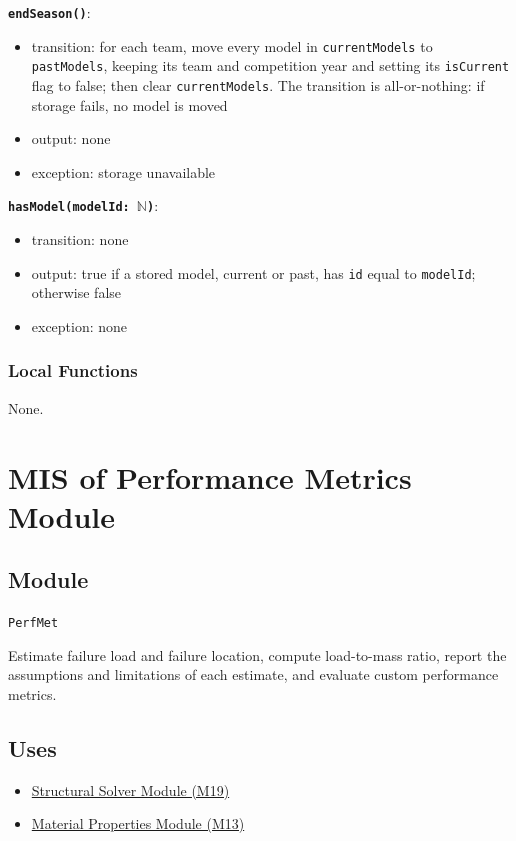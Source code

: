 \documentclass[12pt, titlepage]{article}
\begin{document}
\textbf{\texttt{endSeason()}}:
\begin{itemize}
  \item transition: for each team, move every model in \texttt{currentModels} to \texttt{pastModels}, keeping its team and competition year and setting its \texttt{isCurrent} flag to false; then clear \texttt{currentModels}. The transition is all-or-nothing: if storage fails, no model is moved
  \item output: none
  \item exception: storage unavailable
\end{itemize}

\textbf{\texttt{hasModel(modelId: $\mathbb{N}$)}}:
\begin{itemize}
  \item transition: none
  \item output: true if a stored model, current or past, has \texttt{id} equal to \texttt{modelId}; otherwise false
  \item exception: none
\end{itemize}

\subsubsection{Local Functions}
None.

\newpage

\section{MIS of Performance Metrics Module} \label{mMetrics}

\subsection{Module}
\texttt{PerfMet}

Estimate failure load and failure location, compute load-to-mass ratio, report the assumptions and limitations of each estimate, and evaluate custom performance metrics.

\subsection{Uses}
\begin{itemize}
  \item \hyperref[mSolver]{Structural Solver Module (M19)}
  \item \hyperref[mMatProps]{Material Properties Module (M13)}
\end{itemize}
\end{document}
